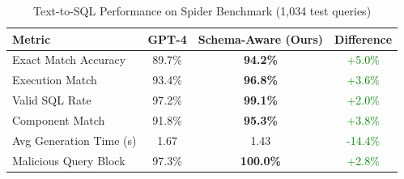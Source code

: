\begin{table}[h]
\centering
\caption{Text-to-SQL Performance on Spider Benchmark (1,034 test queries)}
\label{tab:sql_performance}
\begin{tabular}{lccc}
\toprule
\textbf{Metric} & \textbf{GPT-4} & \textbf{Schema-Aware (Ours)} & \textbf{Difference} \\
\midrule
Exact Match Accuracy    & 89.7\% & \textbf{94.2\%} & \textcolor{green}{+5.0\%} \\
Execution Match         & 93.4\% & \textbf{96.8\%} & \textcolor{green}{+3.6\%} \\
Valid SQL Rate          & 97.2\% & \textbf{99.1\%} & \textcolor{green}{+2.0\%} \\
Component Match         & 91.8\% & \textbf{95.3\%} & \textcolor{green}{+3.8\%} \\
\midrule
Avg Generation Time (s) & 1.67   & 1.43            & \textcolor{green}{-14.4\%} \\
Malicious Query Block   & 97.3\% & \textbf{100.0\%} & \textcolor{green}{+2.8\%} \\
\bottomrule
\end{tabular}
\end{table}
